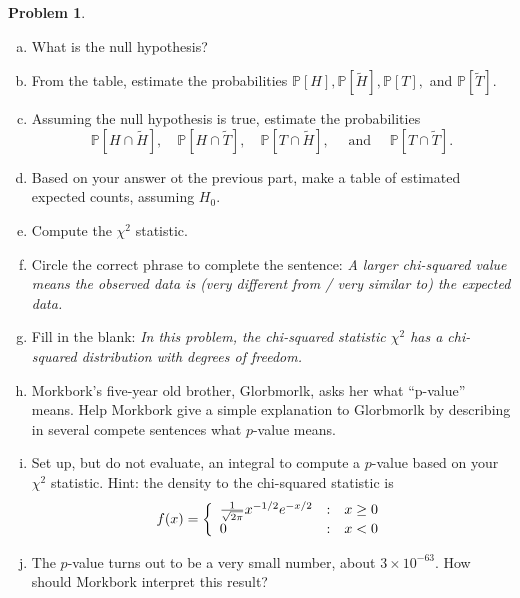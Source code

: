 \documentclass[10pt]{article}
\theoremstyle{definition}
\newtheorem{problem}[theorem]{Problem}
\newcommand{\1}[1]{\textbf{1}_{\left[#1\right]}} %
\def\P{\mathbb{P}} %
\begin{document}
\begin{problem}
  \begin{enumerate}[(a)]
    \item What is the null hypothesis?
    \item From the table, estimate the probabilities $\P[H ],
    \P[\widetilde{H} ], \P[T ],$ and
    $\P[\widetilde{T} ]$.
    \item Assuming the null hypothesis is true, estimate the probabilities
    \begin{equation*}
      \P[H \cap\widetilde{H} ],\quad \P[H\cap \widetilde{T} ],\quad
      \P[T\cap \widetilde{H} ],\quad\text{ and }\quad\P[T \cap\widetilde{T}].
    \end{equation*}
    \item Based on your answer ot the previous part, make a table of estimated
    expected counts, assuming $H_{0}$.
    \item Compute the $\chi^{2}$ statistic.
    \item Circle the correct phrase to complete the sentence: \textit{A larger
      chi-squared value means the observed data is (very different from / very
      similar to) the expected data.}
    \item Fill in the blank: \textit{In this problem, the chi-squared
      statistic $\chi^{2}$ has a chi-squared distribution with
      \underline{\phantom \quad \quad \quad} degrees of freedom.}
    \item Morkbork's five-year old brother, Glorbmorlk, asks her what
    ``p-value'' means. Help Morkbork give a simple explanation to Glorbmorlk
    by describing in several compete sentences what $p$-value means.
    
    \item Set up, but do not evaluate, an integral to compute a $p$-value
    based on your $\chi^{2}$ statistic. Hint: the density to the chi-squared
    statistic is
    \begin{equation*}
      f(x) = \left\{ \begin{array}{l@{\quad:\quad}l} \frac{1}{\sqrt{2\pi}} x^{-1/2}e^{-x/2} & x \geq 0\\ 0& x<0
        \end{array}\right.
    \end{equation*}
    \item The $p$-value turns out to be a very small number, about
    $3\times 10^{-63}$. How should Morkbork interpret this result?
  \end{enumerate}
\end{problem}
\end{document}
